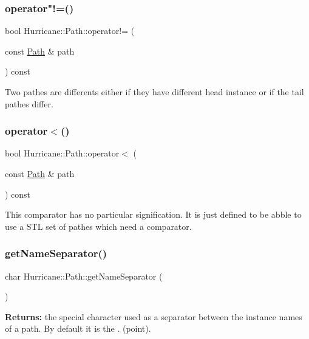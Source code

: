 \subsubsection{\texorpdfstring{operator"!=()}{operator!=()}}
{\footnotesize\ttfamily bool Hurricane\+::\+Path\+::operator!= (\begin{DoxyParamCaption}\item[{const \mbox{\hyperlink{classHurricane_1_1Path}{Path}} \&}]{path }\end{DoxyParamCaption}) const}

Two pathes are differents either if they have different head instance or if the tail pathes differ. \mbox{\label{classHurricane_1_1Path_a5bf33d2d9e3e7d46db770e26c09be90b}} 
\subsubsection{\texorpdfstring{operator$<$()}{operator<()}}
{\footnotesize\ttfamily bool Hurricane\+::\+Path\+::operator$<$ (\begin{DoxyParamCaption}\item[{const \mbox{\hyperlink{classHurricane_1_1Path}{Path}} \&}]{path }\end{DoxyParamCaption}) const}

This comparator has no particular signification. It is just defined to be abble to use a S\+TL set of pathes which need a comparator. \mbox{\label{classHurricane_1_1Path_ac63015239df43b8c44a6d74a262eb3a2}} 
\subsubsection{\texorpdfstring{get\+Name\+Separator()}{getNameSeparator()}}
{\footnotesize\ttfamily char Hurricane\+::\+Path\+::get\+Name\+Separator (\begin{DoxyParamCaption}{ }\end{DoxyParamCaption})\hspace{0.3cm}{\ttfamily [static]}}

{\bfseries Returns\+:} the special character used as a separator between the instance names of a path. By default it is the \textquotesingle{}.\textquotesingle{} (point). \mbox{\label{classHurricane_1_1Path_afddde635f302cee0a215ca364e9689b5}} 
